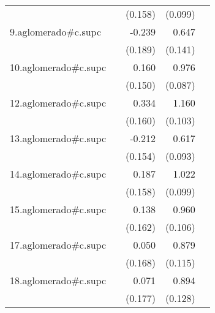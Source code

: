 {\begin{longtable}{l*{4}{D{.}{.}{-1}}}
            &                     &     (0.158)         &     (0.099)         &                     \\
\addlinespace
9.aglomerado#c.supc&                     &      -0.239         &       0.647\sym{***}&                     \\
            &                     &     (0.189)         &     (0.141)         &                     \\
\addlinespace
10.aglomerado#c.supc&                     &       0.160         &       0.976\sym{***}&                     \\
            &                     &     (0.150)         &     (0.087)         &                     \\
\addlinespace
12.aglomerado#c.supc&                     &       0.334\sym{*}  &       1.160\sym{***}&                     \\
            &                     &     (0.160)         &     (0.103)         &                     \\
\addlinespace
13.aglomerado#c.supc&                     &      -0.212         &       0.617\sym{***}&                     \\
            &                     &     (0.154)         &     (0.093)         &                     \\
\addlinespace
14.aglomerado#c.supc&                     &       0.187         &       1.022\sym{***}&                     \\
            &                     &     (0.158)         &     (0.099)         &                     \\
\addlinespace
15.aglomerado#c.supc&                     &       0.138         &       0.960\sym{***}&                     \\
            &                     &     (0.162)         &     (0.106)         &                     \\
\addlinespace
17.aglomerado#c.supc&                     &       0.050         &       0.879\sym{***}&                     \\
            &                     &     (0.168)         &     (0.115)         &                     \\
\addlinespace
18.aglomerado#c.supc&                     &       0.071         &       0.894\sym{***}&                     \\
            &                     &     (0.177)         &     (0.128)         &                     \\

\end{longtable}}
